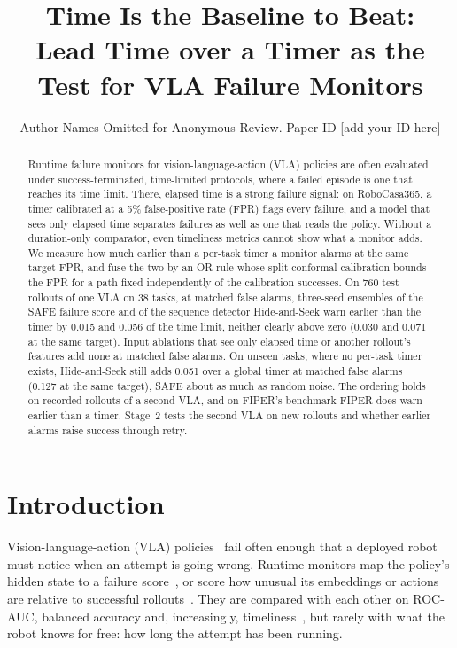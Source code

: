 \documentclass[conference]{IEEEtran}
\begin{document}
\title{Time Is the Baseline to Beat:\\Lead Time over a Timer as the Test for VLA Failure Monitors}

\author{Author Names Omitted for Anonymous Review. Paper-ID [add your ID here]}

\maketitle

\begin{abstract}
Runtime failure monitors for vision-language-action (VLA) policies are often evaluated under
success-terminated, time-limited protocols, where a failed episode is one that reaches its time
limit. There, elapsed time is a strong failure signal: on RoboCasa365, a timer calibrated at a
5\% false-positive rate (FPR) flags every failure, and a model that sees only elapsed time
separates failures as well as one that reads the policy. Without a duration-only comparator,
even timeliness metrics cannot show what a monitor adds. We measure how much earlier than a
per-task timer a monitor alarms at the same target FPR, and fuse the two by an OR rule whose
split-conformal calibration bounds the FPR for a path fixed independently of the calibration
successes. On 760 test rollouts of one VLA on 38 tasks, at matched false alarms, three-seed
ensembles of the SAFE failure score and of the sequence detector Hide-and-Seek warn earlier than
the timer by 0.015 and 0.056 of the time limit, neither clearly above zero (0.030 and 0.071 at
the same target). Input ablations that see only elapsed time or another rollout's features add
none at matched false alarms. On unseen tasks, where no
per-task timer exists, Hide-and-Seek still adds 0.051 over a global timer at matched false alarms
(0.127 at the same target), SAFE about as much as random noise. The ordering holds on recorded rollouts of a second VLA, and on FIPER's benchmark
FIPER does warn earlier than a timer. Stage~2 tests the second VLA on new rollouts and whether earlier alarms
raise success through retry.
\end{abstract}

\IEEEpeerreviewmaketitle

\section{Introduction}

Vision-language-action (VLA) policies~\cite{kim2024openvla,black2025pi0} fail often enough that
a deployed robot must notice when an attempt is going wrong. Runtime monitors map the policy's
hidden state to a failure score~\cite{gu2025safe}, or score how unusual its embeddings or actions
are relative to successful rollouts~\cite{xu2025faildetect,romer2025fiper}. They are compared
with each other on ROC-AUC, balanced accuracy and, increasingly,
timeliness~\cite{romer2025fiper,park2026hideseek}, but rarely with what the robot knows for free:
how long the attempt has been running.
\end{document}
